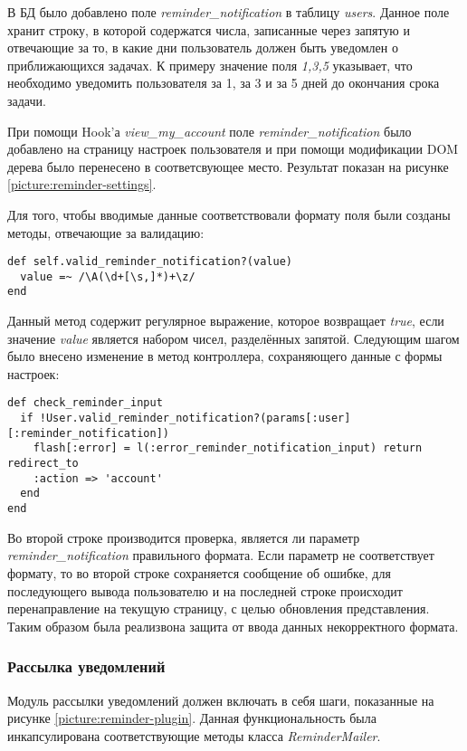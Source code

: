 В БД было добавлено поле \textit{reminder\_notification} в таблицу
\textit{users}. Данное поле хранит строку, в которой содержатся числа,
записанные через запятую и отвечающие за то, в какие дни пользователь должен
быть уведомлен о приближающихся задачах. К примеру значение поля \textit{1,3,5}
указывает, что необходимо уведомить пользователя за 1, за 3 и за 5 дней до
окончания срока задачи. 

При помощи Hook'а \textit{view\_my\_account} поле
\textit{reminder\_notification} было добавлено на страницу настроек
пользователя и при помощи модификации DOM дерева было перенесено в
соответсвующее место. Результат показан на рисунке
\ref{picture:reminder-settings}.

Для того, чтобы вводимые данные соответствовали формату поля были созданы
методы, отвечающие за валидацию:
\small{\begin{lstlisting}
def self.valid_reminder_notification?(value)
  value =~ /\A(\d+[\s,]*)+\z/
end
\end{lstlisting}}
Данный метод содержит регулярное выражение, которое возвращает \textit{true},
если значение \textit{value} является набором чисел, разделённых запятой.
Следующим шагом было внесено изменение в метод контроллера, сохраняющего данные
с формы настроек:
\small{\begin{lstlisting}
def check_reminder_input
  if !User.valid_reminder_notification?(params[:user][:reminder_notification])
    flash[:error] = l(:error_reminder_notification_input) return redirect_to
    :action => 'account'
  end
end
\end{lstlisting}}
Во второй строке производится проверка, является ли параметр
\textit{reminder\_notification} правильного формата.
Если параметр не соответствует формату, то во второй строке сохраняется
сообщение об ошибке, для последующего вывода пользователю и на последней строке
происходит перенаправление на текущую страницу, с  целью обновления
представления. Таким образом была реализвона защита от ввода данных
некорректного формата.

\subsubsection{Рассылка уведомлений}
Модуль рассылки уведомлений должен включать в себя шаги, показанные на рисунке
\ref{picture:reminder-plugin}. Данная функциональность была инкапсулирована
соответствующие методы класса \textit{ReminderMailer}.

